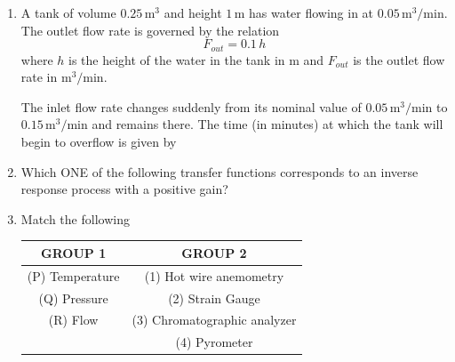 \documentclass[journal,12pt,onecolumn]{IEEEtran}
\theoremstyle{remark}
\begin{document}
\begin{enumerate}
\item A tank of volume $0.25 \, \text{m}^3$ and height $1 \, \text{m}$ has water flowing in at $0.05 \, \text{m}^3/\text{min}$. The outlet flow rate is governed by the relation
\[F_{out} = 0.1 \, h\]
where $h$ is the height of the water in the tank in m and $F_{out}$ is the outlet flow rate in $\text{m}^3/\text{min}$.

The inlet flow rate changes suddenly from its nominal value of $0.05 \, \text{m}^3/\text{min}$ to $0.15 \, \text{m}^3/\text{min}$ and remains there. The time (in minutes) at which the tank will begin to overflow is given by
\hfill{}
\begin{enumerate}
\end{enumerate}

\item Which ONE of the following transfer functions corresponds to an inverse response process with a positive gain?
\hfill{}
\begin{enumerate}
\end{enumerate}

\item Match the following
\begin{center}
\begin{tabular}{c|c}
GROUP 1 & GROUP 2 \\
\hline
(P) Temperature & (1) Hot wire anemometry \\
(Q) Pressure & (2) Strain Gauge \\
(R) Flow & (3) Chromatographic analyzer \\
& (4) Pyrometer \\
\end{tabular}
\end{center}
\hfill{}
\begin{enumerate}
\end{enumerate}


\end{enumerate}
\end{document}
